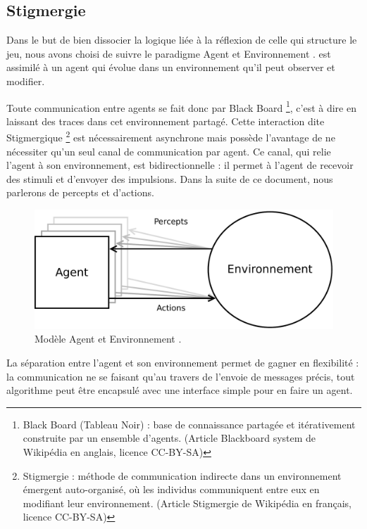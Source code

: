 \subsection{ \og Stigmergie \fg{} }

Dans le but de bien dissocier la logique liée à la réflexion de celle qui structure le jeu, nous avons choisi de suivre le paradigme \og Agent et Environnement \fg{}. \cogito{} est assimilé à un agent qui évolue dans un environnement qu'il peut observer et modifier.

Toute communication entre agents se fait donc par \og Black Board \fg{}\footnote{ \og Black Board \fg{} (Tableau Noir) : base de connaissance partagée et itérativement construite par un ensemble d'agents. (Article \og Blackboard system \fg{} de Wikipédia en anglais, licence CC-BY-SA)}, c'est à dire en laissant des traces dans cet environnement partagé. Cette interaction dite \og Stigmergique \fg{}\footnote{\og Stigmergie \fg{} : méthode de communication indirecte dans un environnement émergent auto-organisé, où les individus communiquent entre eux en modifiant leur environnement. (Article \og Stigmergie \fg{} de Wikipédia en français, licence CC-BY-SA)} est nécessairement asynchrone mais possède l'avantage de ne nécessiter qu'un seul canal de communication par agent. Ce canal, qui relie l'agent à son environnement, est bidirectionnelle : il permet à l'agent de recevoir des stimuli et d'envoyer des impulsions. Dans la suite de ce document, nous parlerons de \og percepts\fg{} et d'\og actions\fg{}.

\begin{figure}[H] 
\centering
\includegraphics[width=\textwidth]{files/env/agent_env} 
\caption{Modèle \og Agent et Environnement \fg{}.} 
\label{agent_env}
\end{figure}

La séparation entre l'agent et son environnement permet de gagner en flexibilité : la communication ne se faisant qu'au travers de l'envoie de messages précis, tout algorithme peut être encapsulé avec une interface simple pour en faire un agent.

